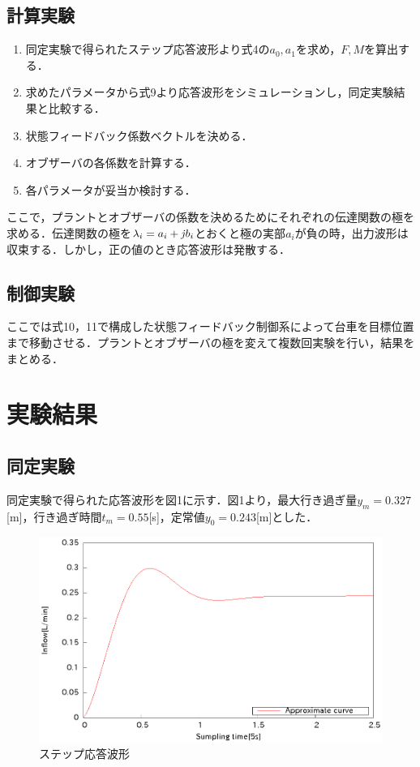 \documentclass[11pt,a4paper]{jsarticle}
\begin{document}
 \subsection{計算実験}
 \begin{enumerate}
  \item 同定実験で得られたステップ応答波形より式4の$a_0,a_1$を求め，$F,M$を算出する．
  \item 求めたパラメータから式9より応答波形をシミュレーションし，同定実験結果と比較する．
  \item 状態フィードバック係数ベクトルを決める．
  \item オブザーバの各係数を計算する．
  \item 各パラメータが妥当か検討する．
 \end{enumerate}
ここで，プラントとオブザーバの係数を決めるためにそれぞれの伝達関数の極を求める．伝達関数の極を$\lambda_i = a_i + {\it j}b_i$とおくと極の実部$a_i$が負の時，出力波形は収束する．しかし，正の値のとき応答波形は発散する．

 \subsection{制御実験}
 ここでは式10，11で構成した状態フィードバック制御系によって台車を目標位置まで移動させる．プラントとオブザーバの極を変えて複数回実験を行い，結果をまとめる．
 
\section{実験結果}
  \subsection{同定実験}
  同定実験で得られた応答波形を図1に示す．図1より，最大行き過ぎ量$y_m = 0.327$[m]，行き過ぎ時間$t_m = 0.55$[s]，定常値$y_0 = 0.243$[m]とした．

  \begin{figure}[hb]
   \begin{center}
    \includegraphics[scale=.8]{./picture/exp1.eps}
   \end{center}
   \caption{ステップ応答波形}
  \end{figure}
  
\end{document}
